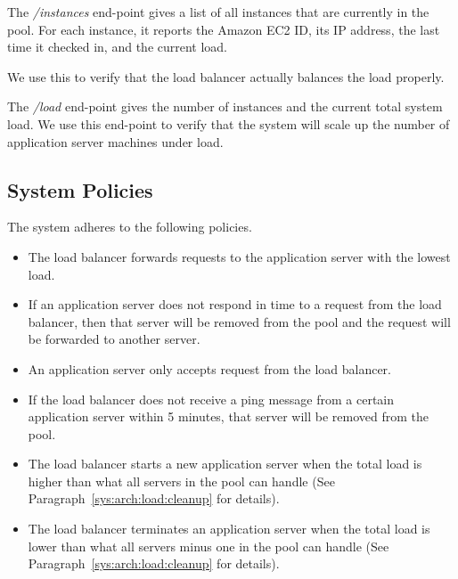 			The \textit{/instances} end-point gives a list of all instances that are currently in the pool.
			For each instance, it reports the Amazon EC2 ID, its IP address, the last time it checked in, and the current load.
			
			We use this to verify that the load balancer actually balances the load properly.
			
			The \textit{/load} end-point gives the number of instances and the current total system load.
			We use this end-point to verify that the system will scale up the number of application server machines under load.

\subsection{System Policies}
	The system adheres to the following policies.

	\begin{itemize}
		\item The load balancer forwards requests to the application server with the lowest load.
		\item If an application server does not respond in time to a request from the load balancer, then that server will be removed from the pool and the request will be forwarded to another server.
		\item An application server only accepts request from the load balancer.
		\item If the load balancer does not receive a ping message from a certain application server within 5 minutes, that server will be removed from the pool.
		\item The load balancer starts a new application server when the total load is higher than what all servers in the pool can handle (See Paragraph~\ref{sys:arch:load:cleanup} for details).
		\item The load balancer terminates an application server when the total load is lower than what all servers minus one in the pool can handle (See Paragraph~\ref{sys:arch:load:cleanup} for details).
	\end{itemize}
	